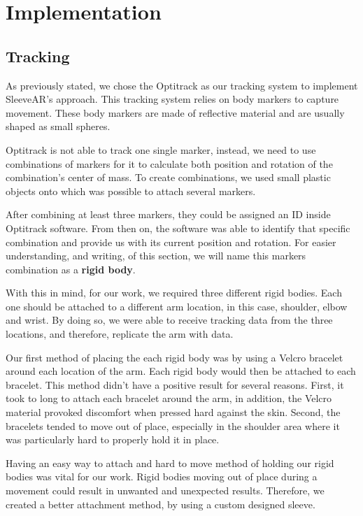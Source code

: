 \section{Implementation}

\subsection{Tracking}
\label{prototype-tracking}

As previously stated, we chose the Optitrack as our tracking system to implement SleeveAR's approach. This tracking system relies on body markers to capture movement.
These body markers are made of reflective material and are usually shaped as small spheres.

Optitrack is not able to track one single marker, instead, we need to use combinations of markers for it to calculate both position and rotation of the combination's center of mass. To create combinations, we used small plastic objects onto which was possible to attach several markers.

After combining at least three markers, they could be assigned an ID inside Optitrack software. 
From then on, the software was able to identify that specific combination and provide us with its current position and rotation.
For easier understanding, and writing, of this section, we will name this markers combination as a \textbf{rigid body}.

With this in mind, for our work, we required three different rigid bodies. Each one should be attached to a different arm location, in this case, shoulder, elbow and wrist. 
By doing so, we were able to receive tracking data from the three locations, and therefore, replicate the arm with data.

Our first method of placing the each rigid body was by using a Velcro bracelet around each location of the arm. Each rigid body would then be attached to each bracelet. This method didn't have a positive result for several reasons. First, it took to long to attach each bracelet around the arm, in addition, the Velcro material provoked discomfort when pressed hard against the skin. Second, the bracelets tended to move out of place, especially in the shoulder area where it was particularly hard to properly hold it in place.

Having an easy way to attach and hard to move method of holding our rigid bodies was vital for our work. Rigid bodies moving out of place during a movement could result in unwanted and unexpected results. Therefore, we created a better attachment method, by using a custom designed sleeve.


